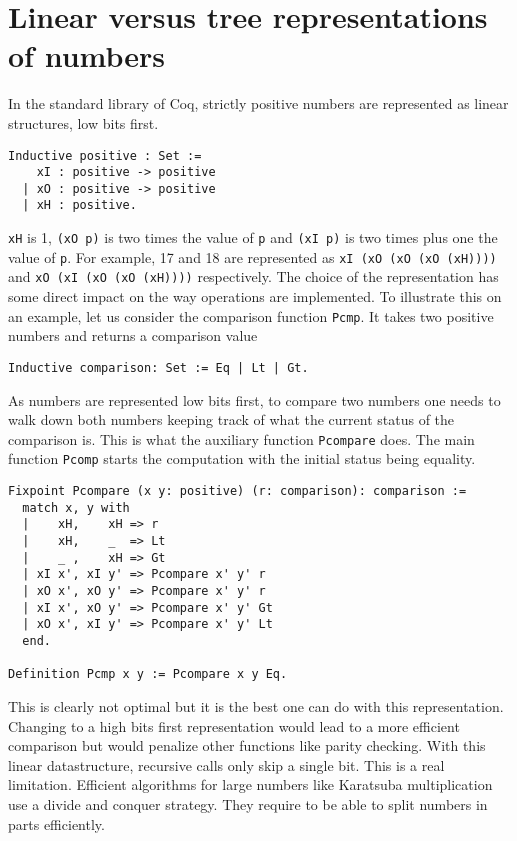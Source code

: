 \section{Linear versus tree representations of numbers\label{ZTree}}

In the standard library of {\sc Coq}, strictly positive numbers are represented as linear structures, low bits first.

\begin{verbatim}
Inductive positive : Set :=
    xI : positive -> positive 
  | xO : positive -> positive 
  | xH : positive.
\end{verbatim}
 {\tt xH} is 1, {\tt (xO p)} is two times the value of {\tt p}
 and {\tt (xI p)} is two times plus one the value of {\tt p}.
For example, 17 and 18 are represented as {\tt xI (xO (xO (xO (xH))))} and
{\tt xO (xI (xO (xO (xH))))} respectively. The choice of the representation
has some direct impact on the way operations are implemented. To illustrate this on an example,
let us consider the comparison function {\tt Pcmp}. It takes two positive numbers
and returns a comparison value
\begin{verbatim}
Inductive comparison: Set := Eq | Lt | Gt.
\end{verbatim}
As numbers are represented low bits first, to compare two numbers 
one needs to walk down both numbers keeping track of what the current status
of the comparison is. This is what the auxiliary function {\tt Pcompare} does. The main 
function {\tt Pcomp} starts the computation with the initial status being equality.
\begin{verbatim}
Fixpoint Pcompare (x y: positive) (r: comparison): comparison :=
  match x, y with
  |    xH,    xH => r
  |    xH,    _  => Lt
  |    _ ,    xH => Gt
  | xI x', xI y' => Pcompare x' y' r
  | xO x', xO y' => Pcompare x' y' r
  | xI x', xO y' => Pcompare x' y' Gt
  | xO x', xI y' => Pcompare x' y' Lt
  end.
  
Definition Pcmp x y := Pcompare x y Eq.
\end{verbatim}
This is clearly not optimal but it is the best one can do with this representation. 
Changing to a high bits first representation would lead to a more efficient
comparison but would penalize other functions like parity checking. With this linear
datastructure, recursive calls only skip a single bit. 
This is a real limitation. Efficient algorithms for large numbers like Karatsuba 
multiplication~\cite{Karat} use a divide and conquer strategy. They require to be able to split numbers
in parts efficiently. 
